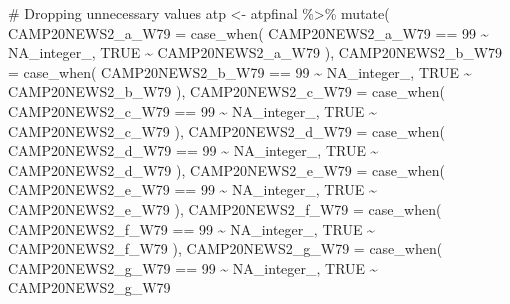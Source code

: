 \documentclass[
  letterpaper,
  DIV=11,
  numbers=noendperiod]{scrartcl}
\newenvironment{Shaded}{\begin{snugshade}}{\end{snugshade}}
\newcommand{\AttributeTok}[1]{\textcolor[rgb]{0.40,0.45,0.13}{#1}}
\newcommand{\CommentTok}[1]{\textcolor[rgb]{0.37,0.37,0.37}{#1}}
\newcommand{\ConstantTok}[1]{\textcolor[rgb]{0.56,0.35,0.01}{#1}}
\newcommand{\DecValTok}[1]{\textcolor[rgb]{0.68,0.00,0.00}{#1}}
\newcommand{\FunctionTok}[1]{\textcolor[rgb]{0.28,0.35,0.67}{#1}}
\newcommand{\NormalTok}[1]{\textcolor[rgb]{0.00,0.23,0.31}{#1}}
\newcommand{\OtherTok}[1]{\textcolor[rgb]{0.00,0.23,0.31}{#1}}
\newcommand{\SpecialCharTok}[1]{\textcolor[rgb]{0.37,0.37,0.37}{#1}}
\begin{document}
\begin{Shaded}
\begin{Highlighting}[]
\CommentTok{\# Dropping unnecessary values}
\NormalTok{atp }\OtherTok{\textless{}{-}}\NormalTok{ atpfinal }\SpecialCharTok{\%\textgreater{}\%}  
\FunctionTok{mutate}\NormalTok{(}
    \AttributeTok{CAMP20NEWS2\_a\_W79 =} \FunctionTok{case\_when}\NormalTok{(}
\NormalTok{      CAMP20NEWS2\_a\_W79 }\SpecialCharTok{==} \DecValTok{99} \SpecialCharTok{\textasciitilde{}} \ConstantTok{NA\_integer\_}\NormalTok{,}
      \ConstantTok{TRUE} \SpecialCharTok{\textasciitilde{}}\NormalTok{ CAMP20NEWS2\_a\_W79}
\NormalTok{    ),}
    \AttributeTok{CAMP20NEWS2\_b\_W79 =} \FunctionTok{case\_when}\NormalTok{(}
\NormalTok{      CAMP20NEWS2\_b\_W79 }\SpecialCharTok{==} \DecValTok{99} \SpecialCharTok{\textasciitilde{}} \ConstantTok{NA\_integer\_}\NormalTok{,}
      \ConstantTok{TRUE} \SpecialCharTok{\textasciitilde{}}\NormalTok{ CAMP20NEWS2\_b\_W79}
\NormalTok{    ),}
    \AttributeTok{CAMP20NEWS2\_c\_W79 =} \FunctionTok{case\_when}\NormalTok{(}
\NormalTok{      CAMP20NEWS2\_c\_W79 }\SpecialCharTok{==} \DecValTok{99} \SpecialCharTok{\textasciitilde{}} \ConstantTok{NA\_integer\_}\NormalTok{,}
      \ConstantTok{TRUE} \SpecialCharTok{\textasciitilde{}}\NormalTok{ CAMP20NEWS2\_c\_W79}
\NormalTok{    ),}
    \AttributeTok{CAMP20NEWS2\_d\_W79 =} \FunctionTok{case\_when}\NormalTok{(}
\NormalTok{      CAMP20NEWS2\_d\_W79 }\SpecialCharTok{==} \DecValTok{99} \SpecialCharTok{\textasciitilde{}} \ConstantTok{NA\_integer\_}\NormalTok{,}
      \ConstantTok{TRUE} \SpecialCharTok{\textasciitilde{}}\NormalTok{ CAMP20NEWS2\_d\_W79}
\NormalTok{    ),}
    \AttributeTok{CAMP20NEWS2\_e\_W79 =} \FunctionTok{case\_when}\NormalTok{(}
\NormalTok{      CAMP20NEWS2\_e\_W79 }\SpecialCharTok{==} \DecValTok{99} \SpecialCharTok{\textasciitilde{}} \ConstantTok{NA\_integer\_}\NormalTok{,}
      \ConstantTok{TRUE} \SpecialCharTok{\textasciitilde{}}\NormalTok{ CAMP20NEWS2\_e\_W79}
\NormalTok{    ),}
    \AttributeTok{CAMP20NEWS2\_f\_W79 =} \FunctionTok{case\_when}\NormalTok{(}
\NormalTok{      CAMP20NEWS2\_f\_W79 }\SpecialCharTok{==} \DecValTok{99} \SpecialCharTok{\textasciitilde{}} \ConstantTok{NA\_integer\_}\NormalTok{,}
      \ConstantTok{TRUE} \SpecialCharTok{\textasciitilde{}}\NormalTok{ CAMP20NEWS2\_f\_W79}
\NormalTok{    ),}
    \AttributeTok{CAMP20NEWS2\_g\_W79 =} \FunctionTok{case\_when}\NormalTok{(}
\NormalTok{      CAMP20NEWS2\_g\_W79 }\SpecialCharTok{==} \DecValTok{99} \SpecialCharTok{\textasciitilde{}} \ConstantTok{NA\_integer\_}\NormalTok{,}
      \ConstantTok{TRUE} \SpecialCharTok{\textasciitilde{}}\NormalTok{ CAMP20NEWS2\_g\_W79}

\end{Highlighting}
\end{Shaded}
\end{document}

